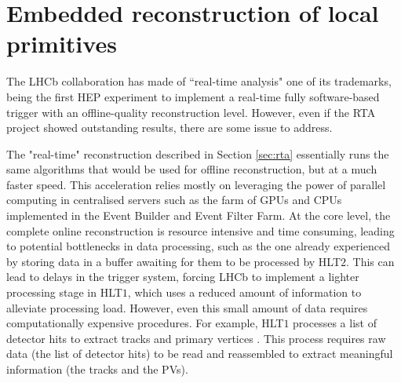 
\chapter{Embedded reconstruction of local primitives}
\label{chp:retina}

The LHCb collaboration has made of ``real-time analysis" one of its trademarks, being the first HEP experiment to implement a real-time fully software-based trigger with an offline-quality reconstruction level. However, even if the RTA project showed outstanding results, there are some issue to address. 

The "real-time" reconstruction described in Section \ref{sec:rta} essentially runs the same algorithms that would be used for offline reconstruction, but at a much faster speed. This acceleration relies mostly on leveraging the power of parallel computing in centralised servers such as the farm of GPUs and CPUs implemented in the Event Builder and Event Filter Farm.
At the core level, the complete online reconstruction is resource intensive and time consuming, leading to potential bottlenecks in data processing, such as the one already experienced by storing data in a buffer awaiting for them to be processed by HLT$2$. This can lead to delays in the trigger system, forcing LHCb to implement a lighter processing stage in HLT$1$, which uses a reduced amount of information to alleviate processing load.
However, even this small amount of data requires computationally expensive procedures. For example, HLT$1$ processes a list of detector hits to extract tracks and primary vertices \cite{https://doi.org/10.5281/zenodo.8119731}. This process requires raw data (the list of detector hits) to be read and reassembled to extract meaningful information (the tracks and the PVs).

